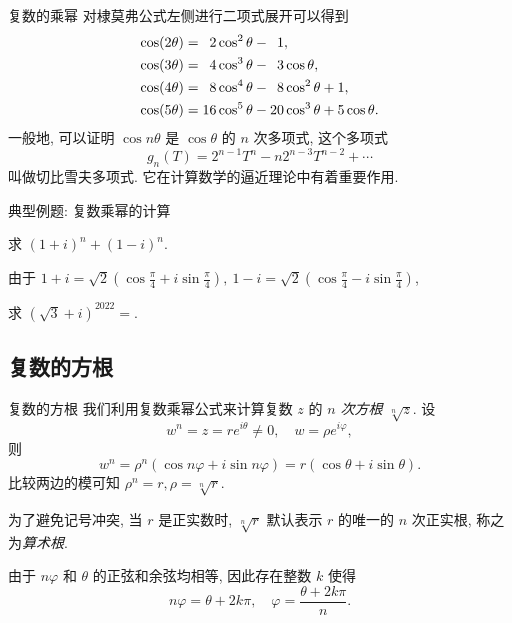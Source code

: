 \begin{frame}{复数的乘幂\noexer}
	\onslide<+->
	对棣莫弗公式左侧进行二项式展开可以得到
	\onslide<+->
	\begin{align*}
		\cos(2\theta)&=\hphantom{1}2\cos^2\theta-\hphantom{1}1,\\
		\cos(3\theta)&=\hphantom{1}4\cos^3\theta-\hphantom{1}3\cos\theta,\\
		\cos(4\theta)&=\hphantom{1}8\cos^4\theta-\hphantom{1}8\cos^2\theta+1,\\
		\cos(5\theta)&=16\cos^5\theta-20\cos^3\theta+5\cos\theta.
	\end{align*}
	\onslide<+->
	一般地, 可以证明 $\cos{n\theta}$ 是 $\cos\theta$ 的 $n$ 次多项式,
	\onslide<+->
	这个多项式
	\[g_n(T)=2^{n-1}T^n-n2^{n-3}T^{n-2}+\cdots\]
	叫做切比雪夫多项式.
	\onslide<+->
	它在计算数学的逼近理论中有着重要作用.
\end{frame}


\begin{frame}{典型例题: 复数乘幂的计算}
	\onslide<+->
	\begin{example}
		求 $(1+i)^n+(1-i)^n$.
	\end{example}

	\onslide<+->
	\begin{solution}
		由于 $1+i=\sqrt2\left(\cos\frac\pi4+i\sin\frac\pi4\right),\ 
		1-i=\sqrt2\left(\cos\frac\pi4-i\sin\frac\pi4\right)$,
		\vspace{-\baselineskip}
	\end{solution}

	\onslide<+->
	\begin{exercise}
		求 $(\sqrt3+i)^{2022}=$.
	\end{exercise}
\end{frame}


\subsection{复数的方根}
\begin{frame}{复数的方根}
	\onslide<+->
	我们利用复数乘幂公式来计算复数 $z$ 的 \emph{$n$ 次方根 $\sqrt[n]z$}.
	\onslide<+->
	设
	\[w^n=z=re^{i\theta}\neq0,\quad w=\rho e^{i\varphi},\]
	\onslide<+->
	则
	\[w^n=\rho^n(\cos{n\varphi}+i\sin{n\varphi})=r(\cos\theta+i\sin\theta).\]
	\onslide<+->
	比较两边的模可知 $\rho^n=r,\rho=\sqrt[n]r$.

	\onslide<+->
	为了避免记号冲突, 当 $r$ 是正实数时, $\sqrt[n]r$ 默认表示 $r$ 的唯一的 $n$ 次正实根, 称之为\emph{算术根}.

	\onslide<+->
	由于 $n\varphi$ 和 $\theta$ 的正弦和余弦均相等, 因此存在整数 $k$ 使得
	\[n\varphi=\theta+2k\pi,\quad \varphi=\frac{\theta+2k\pi}n.\]
\end{frame}


